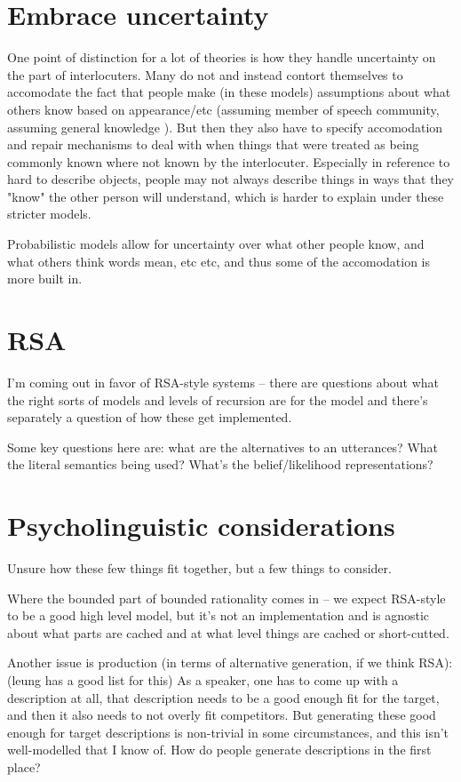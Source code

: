\documentclass[]{article}
\begin{document}
\section{Embrace uncertainty}
One point of distinction for a lot of theories is how they handle uncertainty on the part of interlocuters. Many do not and instead contort themselves to accomodate the fact that people make (in these models) assumptions about what others know based on appearance/etc (assuming member of speech community, assuming general knowledge ). But then they also have to specify accomodation and repair mechanisms to deal with when things that were treated as being commonly known where not known by the interlocuter. Especially in reference to hard to describe objects, people may not always describe things in ways that they "know" the other person will understand, which is harder to explain under these stricter models. 

Probabilistic models allow for uncertainty over what other people know, and what others think words mean, etc etc, and thus some of the accomodation is more built in. 

\section{RSA}

I'm coming out in favor of RSA-style systems -- there are questions about what the right sorts of models and levels of recursion are for the model and there's separately a question of how these get implemented. 

Some key questions here are: what are the alternatives to an utterances? What the literal semantics being used? What's the belief/likelihood representations? 

\section{Psycholinguistic considerations}
Unsure how these few things fit together, but a few things to consider.

Where the bounded part of bounded rationality comes in -- we expect RSA-style to be a good high level model, but it's not an implementation and is agnostic about what parts are cached and at what level things are cached or short-cutted. 

Another issue is production (in terms of alternative generation, if we think RSA): (leung has a good list for this) As a speaker, one has to come up with a description at all, that description needs to be a good enough fit for the target, and then it also needs to not overly fit competitors. But generating these good enough for target descriptions is non-trivial in some circumstances, and this isn't well-modelled that I know of. How do people generate descriptions in the first place? 
\end{document}
